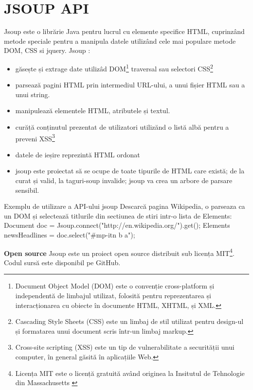 \chapter{JSOUP API}
\vspace{1cm}
Jsoup este o librărie Java pentru lucrul cu elemente specifice HTML, cuprinzând metode speciale pentru a manipula datele utilizând cele mai populare metode DOM, CSS si jquery.\newline
Jsoup :
\begin{itemize}
	\item găsește și extrage date utilizâd DOM\footnote{Document Object Model (DOM) este o convenție cross-platform și independentă de limbajul utilizat, folosită pentru reprezentarea și interacționarea cu obiecte în documente HTML, XHTML, și XML.\cite{16}} traversal sau selectori CSS\footnote{Cascading Style Sheets (CSS) este un limbaj de stil utilizat pentru design-ul și formatarea unui document scris într-un limbaj markup.}
	\item parsează pagini HTML prin intermediul URL-ului, a unui fișier HTML sau a unui string.
	\item manipulează elementele HTML, atributele și textul.
	\item curăță conținutul prezentat de utilizatori utilizănd o listă albă pentru a preveni XSS\footnote{Cross-site scripting (XSS) este un tip de vulnerabilitate a securității unui computer, în general găsită în aplicațiile Web. }
	\item datele de ieșire reprezintă HTML ordonat
	\item jsoup este proiectat să se ocupe de toate tipurile de HTML care există; de la curat și valid, la taguri-soup invalide; jsoup va crea un arbore de parsare sensibil.
\end{itemize}\newpage
\begin{exmp} Exemplu de utilizare a API-ului jsoup\newline
Descarcă pagina Wikipedia, o parseaza ca un DOM și selectează titlurile din sectiunea de stiri intr-o lista de Elements:\newline
Document doc = Jsoup.connect("http://en.wikipedia.org/").get();\newline
Elements newsHeadlines = doc.select("\#mp-itn b a");\newline
\end{exmp}
\textbf{Open source}\newline
Jsoup este un proiect open source distribuit sub licența MIT\footnote{Licența MIT este o licență gratuită având originea la Insitutul de Tehnologie din Massachusetts \cite{17} }. Codul sursă este disponibil pe GitHub.\newline


